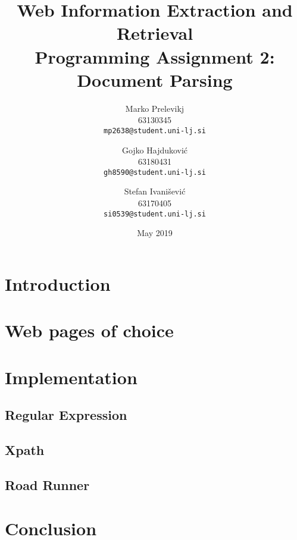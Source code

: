 \documentclass{article}
\title{
Web Information Extraction and Retrieval\\
Programming Assignment 2: \\
Document Parsing
}
\author{
  Marko Prelevikj\\
  63130345\\
  \texttt{mp2638@student.uni-lj.si}
  \and
  Gojko Hajduković\\
  63180431\\
  \texttt{gh8590@student.uni-lj.si}
  \and
  Stefan Ivanišević\\
  63170405\\
  \texttt{si0539@student.uni-lj.si}
}
\date{May 2019}
\begin{document}
\maketitle

\section{Introduction}
\section{Web pages of choice}
\section{Implementation}
\subsection{Regular Expression}
\subsection{Xpath}
\subsection{Road Runner}
\section{Conclusion}
\end{document}
